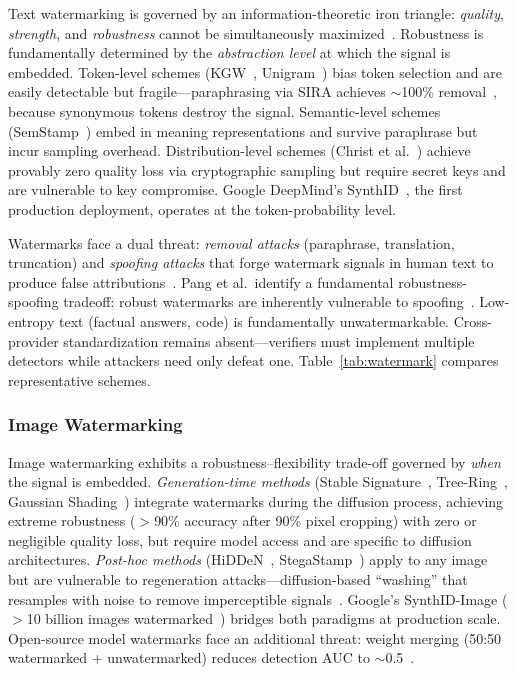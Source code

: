 Text watermarking is governed by an information-theoretic iron triangle: \emph{quality}, \emph{strength}, and \emph{robustness} cannot be simultaneously maximized~\cite{christ2024undetectable}. Robustness is fundamentally determined by the \emph{abstraction level} at which the signal is embedded. Token-level schemes (KGW~\cite{kirchenbauer2023kgw}, Unigram~\cite{zhao2023unigram}) bias token selection and are easily detectable but fragile---paraphrasing via SIRA achieves $\sim$100\% removal~\cite{cheng2025sira}, because synonymous tokens destroy the signal. Semantic-level schemes (SemStamp~\cite{hou2023semstamp}) embed in meaning representations and survive paraphrase but incur sampling overhead. Distribution-level schemes (Christ et al.~\cite{christ2024undetectable}) achieve provably zero quality loss via cryptographic sampling but require secret keys and are vulnerable to key compromise. Google DeepMind's SynthID~\cite{synthidtext2024}, the first production deployment, operates at the token-probability level.

Watermarks face a dual threat: \emph{removal attacks} (paraphrase, translation, truncation) and \emph{spoofing attacks} that forge watermark signals in human text to produce false attributions~\cite{sadasivan2023spoofing}. Pang et al.\ identify a fundamental robustness-spoofing tradeoff: robust watermarks are inherently vulnerable to spoofing~\cite{pang2024nofree}. Low-entropy text (factual answers, code) is fundamentally unwatermarkable. Cross-provider standardization remains absent---verifiers must implement multiple detectors while attackers need only defeat one. Table~\ref{tab:watermark} compares representative schemes.

\subsubsection{Image Watermarking}
\label{sec:wm-image}

Image watermarking exhibits a robustness--flexibility trade-off governed by \emph{when} the signal is embedded. \emph{Generation-time methods} (Stable Signature~\cite{fernandez2023stablesig}, Tree-Ring~\cite{wen2023treering}, Gaussian Shading~\cite{yang2024gaussianshading}) integrate watermarks during the diffusion process, achieving extreme robustness ($>$90\% accuracy after 90\% pixel cropping) with zero or negligible quality loss, but require model access and are specific to diffusion architectures. \emph{Post-hoc methods} (HiDDeN~\cite{zhu2018hidden}, StegaStamp~\cite{tancik2020stegastamp}) apply to any image but are vulnerable to regeneration attacks---diffusion-based ``washing'' that resamples with noise to remove imperceptible signals~\cite{zhao2023regeneration}. Google's SynthID-Image ($>$10 billion images watermarked~\cite{gowal2024synthidimage}) bridges both paradigms at production scale. Open-source model watermarks face an additional threat: weight merging (50:50 watermarked + unwatermarked) reduces detection AUC to $\sim$0.5~\cite{xu2025removal}.

